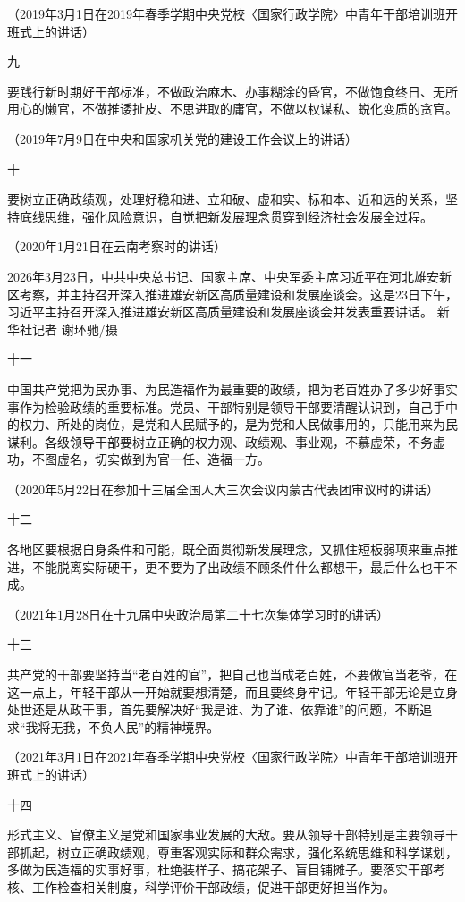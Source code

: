 \documentclass[UTF8,zihao=-4]{ctexart}
\begin{document}
（2019年3月1日在2019年春季学期中央党校〈国家行政学院〉中青年干部培训班开班式上的讲话）

九

要践行新时期好干部标准，不做政治麻木、办事糊涂的昏官，不做饱食终日、无所用心的懒官，不做推诿扯皮、不思进取的庸官，不做以权谋私、蜕化变质的贪官。

（2019年7月9日在中央和国家机关党的建设工作会议上的讲话）

十

要树立正确政绩观，处理好稳和进、立和破、虚和实、标和本、近和远的关系，坚持底线思维，强化风险意识，自觉把新发展理念贯穿到经济社会发展全过程。

（2020年1月21日在云南考察时的讲话）

2026年3月23日，中共中央总书记、国家主席、中央军委主席习近平在河北雄安新区考察，并主持召开深入推进雄安新区高质量建设和发展座谈会。这是23日下午，习近平主持召开深入推进雄安新区高质量建设和发展座谈会并发表重要讲话。 新华社记者 谢环驰/摄

十一

中国共产党把为民办事、为民造福作为最重要的政绩，把为老百姓办了多少好事实事作为检验政绩的重要标准。党员、干部特别是领导干部要清醒认识到，自己手中的权力、所处的岗位，是党和人民赋予的，是为党和人民做事用的，只能用来为民谋利。各级领导干部要树立正确的权力观、政绩观、事业观，不慕虚荣，不务虚功，不图虚名，切实做到为官一任、造福一方。

（2020年5月22日在参加十三届全国人大三次会议内蒙古代表团审议时的讲话）

十二

各地区要根据自身条件和可能，既全面贯彻新发展理念，又抓住短板弱项来重点推进，不能脱离实际硬干，更不要为了出政绩不顾条件什么都想干，最后什么也干不成。

（2021年1月28日在十九届中央政治局第二十七次集体学习时的讲话）

十三

共产党的干部要坚持当“老百姓的官”，把自己也当成老百姓，不要做官当老爷，在这一点上，年轻干部从一开始就要想清楚，而且要终身牢记。年轻干部无论是立身处世还是从政干事，首先要解决好“我是谁、为了谁、依靠谁”的问题，不断追求“我将无我，不负人民”的精神境界。

（2021年3月1日在2021年春季学期中央党校〈国家行政学院〉中青年干部培训班开班式上的讲话）

十四

形式主义、官僚主义是党和国家事业发展的大敌。要从领导干部特别是主要领导干部抓起，树立正确政绩观，尊重客观实际和群众需求，强化系统思维和科学谋划，多做为民造福的实事好事，杜绝装样子、搞花架子、盲目铺摊子。要落实干部考核、工作检查相关制度，科学评价干部政绩，促进干部更好担当作为。
\end{document}
